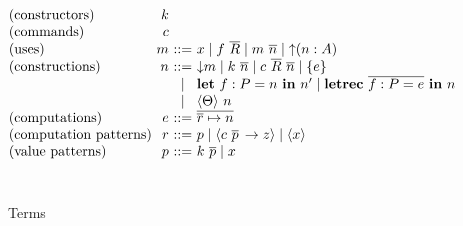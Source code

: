 \documentclass[msc,deptreport,cs]{infthesis} %
\makeatletter
\newcommand{\many}{\overline}
\newcommand\ba{\begin{array}}
\newcommand\ea{\end{array}}
\newenvironment{syntax}{\[\ba{@{}l@{~}r@{~}c@{~}l@{}}}{\ea\]\ignorespacesafterend}
\newcommand{\adapt}{\Theta}
\newcommand{\key}[1]{\mathbf{#1}} %
\newcommand{\handleSymbol}{\rightarrow}
\newcommand{\handle}[2]{{#1} \handleSymbol {#2}}
\newcommand{\thunk}[1]{\{{#1}\}}
\newcommand\slab[1]{(\textrm{#1})}
\newcommand{\effin}[1]{\langle {#1} \rangle}
\newcommand{\uc}{\mathord{\downarrow}}
\newcommand{\cu}{\mathord{\uparrow}}
\newcommand{\gor}{\mid}
\makeatother
\begin{document}
\begin{figure} %
\begin{syntax}
  \slab{constructors}               & k \\
  \slab{commands}                   & c \\
  \slab{uses}                 & m      &::= &
     x \gor f~\many{R} \gor m~\many{n} \gor \cu(n:A) \\
  \slab{constructions}        & n      &::= &
    \uc m \gor k~\many{n} \gor c~\many{R}~\many{n} \gor \thunk{e} \\
                              &        &\gor& \key{let}~f : P = n~\key{in}~n'
                                   \gor
                                   \key{letrec}~\many{f : P = e}~\key{in}~n \\
                              &        &\gor&  \effin{\adapt}~n \\
  \slab{computations}         & e      &::=& \many{\many{r} \mapsto n}
  \\
  \slab{computation patterns} & r      &::=& p
                                        \gor \effin{\handle{c~\many{p}\,}{z}}
                                        \gor \effin{x} \\
  \slab{value patterns}       & p      &::=& k~\many{p} \gor x        \\
\end{syntax}
\\[0.25cm]
\caption{Terms}
\label{fig:terms}
\end{figure}
\end{document}
